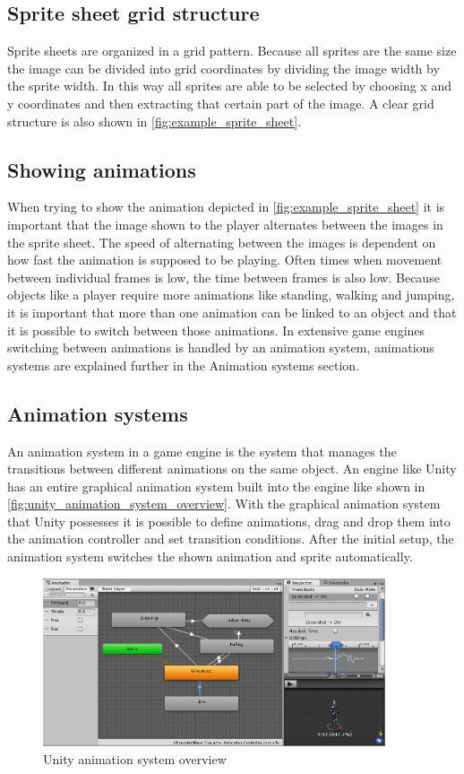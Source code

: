 \documentclass{article} %
\begin{document}
\subsection{Sprite sheet grid structure}
Sprite sheets are organized in a grid pattern.
Because all sprites are the same size the image can be divided into grid coordinates by dividing the image width by the sprite width.
In this way all sprites are able to be selected by choosing x and y coordinates and then extracting that certain part of the image.
A clear grid structure is also shown in \autoref{fig:example_sprite_sheet}.

\subsection{Showing animations}
When trying to show the animation depicted in \autoref{fig:example_sprite_sheet} it is important that the image shown to the player alternates between the images in the sprite sheet.
The speed of alternating between the images is dependent on how fast the animation is supposed to be playing.
Often times when movement between individual frames is low, the time between frames is also low.
Because objects like a player require more animations like standing, walking and jumping, it is important that more than one animation can be linked to an object and that it is possible to switch between those animations.
In extensive game engines switching between animations is handled by an animation system, animations systems are explained further in the Animation systems section.

\subsection{Animation systems}
An animation system in a game engine is the system that manages the transitions between different animations on the same object.
An engine like Unity \cite{unity} has an entire graphical animation system built into the engine like shown in \autoref{fig:unity_animation_system_overview}.
With the graphical animation system that Unity possesses it is possible to define animations, drag and drop them into the animation controller and set transition conditions.
After the initial setup, the animation system switches the shown animation and sprite automatically.

\begin{figure}[h!]
	\centering
	\includegraphics[width=0.9\textwidth]{unity_animation_system_overview.png}
	\caption{Unity animation system overview}
	\label{fig:unity_animation_system_overview}
\end{figure}
\end{document}
